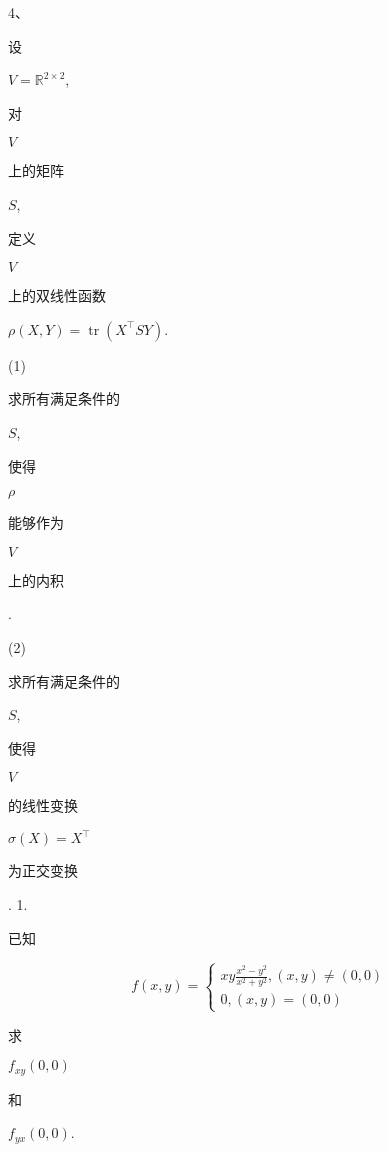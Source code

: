 \documentclass[10pt]{article}
\begin{document}
4、\begin{CJK}{UTF8}{mj}设\end{CJK} $V=\mathbb{R}^{2 \times 2}$, \begin{CJK}{UTF8}{mj}对\end{CJK} $V$ \begin{CJK}{UTF8}{mj}上的矩阵\end{CJK} $S$, \begin{CJK}{UTF8}{mj}定义\end{CJK} $V$ \begin{CJK}{UTF8}{mj}上的双线性函数\end{CJK} $\rho(X, Y)=\operatorname{tr}\left(X^{\top} S Y\right)$.

(1) \begin{CJK}{UTF8}{mj}求所有满足条件的\end{CJK} $S$, \begin{CJK}{UTF8}{mj}使得\end{CJK} $\rho$ \begin{CJK}{UTF8}{mj}能够作为\end{CJK} $V$ \begin{CJK}{UTF8}{mj}上的内积\end{CJK}.

(2) \begin{CJK}{UTF8}{mj}求所有满足条件的\end{CJK} $S$, \begin{CJK}{UTF8}{mj}使得\end{CJK} $V$ \begin{CJK}{UTF8}{mj}的线性变换\end{CJK} $\sigma(X)=X^{\top}$ \begin{CJK}{UTF8}{mj}为正交变换\end{CJK}. 1. \begin{CJK}{UTF8}{mj}已知\end{CJK}
$$
f(x, y)=\left\{\begin{array}{l}
x y \frac{x^{2}-y^{2}}{x^{2}+y^{2}},(x, y) \neq(0,0) \\
0,(x, y)=(0,0)
\end{array}\right.
$$
\begin{CJK}{UTF8}{mj}求\end{CJK} $f_{x y}(0,0)$ \begin{CJK}{UTF8}{mj}和\end{CJK} $f_{y x}(0,0)$.
\end{document}
